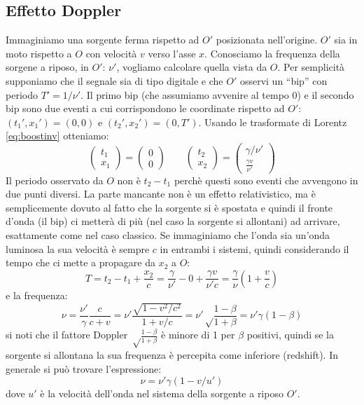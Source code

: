\subsection{Effetto Doppler}
Immaginiamo una sorgente ferma rispetto ad $O'$ posizionata nell'origine. $O'$ sia in moto rispetto a $O$ con velocità $v$ verso l'asse $x$. Conosciamo la frequenza della sorgene a riposo, in $O'$: $\nu'$, vogliamo calcolare quella vista da $O$. Per semplicità supponiamo che il segnale sia di tipo digitale e che $O'$ osservi un ``bip'' con periodo $T'=1/\nu'$. Il primo bip (che assumiamo avvenire al tempo $0$) e il secondo bip sono due eventi a cui corrispondono le coordinate rispetto ad $O'$: $(t_1', x_1') = (0, 0)$ e $(t_2', x_2') = (0, T')$. Usando le trasformate di Lorentz \eqref{eq:boostinv} otteniamo:
\[
   \begin{pmatrix}t_1\\ x_1\end{pmatrix} = \begin{pmatrix}0\\0\end{pmatrix}\qquad \begin{pmatrix}t_2\\ x_2\end{pmatrix} = \begin{pmatrix}\gamma/\nu'\\ \frac{\gamma v}{\nu'}\end{pmatrix}
\]
Il periodo osservato da $O$ non è $t_2-t_1$ perchè questi sono eventi che avvengono in due punti diversi. La parte mancante non è un effetto relativistico, ma è semplicemente dovuto al fatto che la sorgente si è spostata e quindi il fronte d'onda (il bip) ci metterà di più (nel caso la sorgente si allontani) ad arrivare, esattamente come nel caso classico. Se immaginiamo che l'onda sia un'onda luminosa la sua velocità è sempre $c$ in entrambi i sistemi, quindi considerando il tempo che ci mette a propagare da $x_2$ a $O$:
\[
   T = t_2 - t_1 + \frac{x_2}{c} = \frac{\gamma}{\nu'} - 0 + \frac{\gamma v}{\nu' c} = \frac{\gamma}{\nu}\left(1 + \frac{v}{c}\right)
\]
e la frequenza:
\[
   \nu = \frac{\nu'}{\gamma}\frac{c}{c + v} = \nu'\frac{\sqrt{1 - v^2/c^2}}{1+v/c}=\nu'\sqrt\frac{1-\beta}{1+\beta} = \nu'\gamma(1-\beta)
\]
si noti che il fattore Doppler $\sqrt\frac{1-\beta}{1+\beta}$ è minore di 1 per $\beta$ positivi, quindi se la sorgente si allontana la sua frequenza è percepita come inferiore (redshift). In generale si può trovare l'espressione:
\begin{equation}
   \nu = \nu'\gamma\left(1 - v/u'\right)
\end{equation}
dove $u'$ è la velocità dell'onda nel sistema della sorgente a riposo $O'$.

